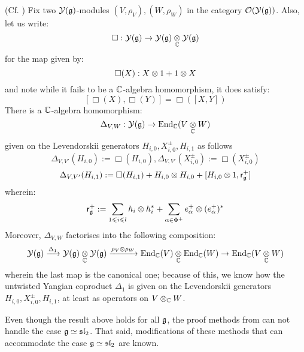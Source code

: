         \begin{proposition} \label{prop: yangian_hopf_structure_via_levendorskii_presentation}
            (Cf. \cite[Definition 4.6, Theorem 4.9, and Proposition 5.18]{guay_nakajima_wendlandt_affine_yangian_coproduct}) Fix two $\mathcal{Y}(\mathfrak{g})$-modules $(V, \rho_V), (W, \rho_W)$ in the category $\mathcal{O}(\mathcal{Y}(\mathfrak{g}))$. Also, let us write:
                $$\Box: \calY(\g) \to \calY(\g) \tensor_{\bbC} \calY(\g)$$
            for the map given by:
                $$\Box(X): X \tensor 1 + 1 \tensor X$$
            and note while it fails to be a $\mathbb{C}$-algebra homomorphism, it does satisfy:
                $$[ \Box(X), \Box(Y) ] = \Box( [X, Y] )$$
            There is a $\mathbb{C}$-algebra homomorphism:
                $$\Delta_{V, W}: \calY(\g) \to \End_{\bbC}(V \tensor_{\bbC} W)$$
            given on the Levendorskii generators $H_{i, 0}, X_{i, 0}^{\pm}, H_{i, 1}$ as follows
                $$\Delta_{V, V'}(H_{i, 0}) := \Box(H_{i, 0}), \Delta_{V, V'}(X_{i, 0}^{\pm}) := \Box(X_{i, 0}^{\pm})$$
                $$\Delta_{V, V'}(H_{i, 1}) := \Box(H_{i, 1}) + H_{i, 0} \tensor H_{i, 0} + [H_{i, 0} \tensor 1, \sfr_{\g}^+]$$
            wherein:
                $$\sfr_{\g}^+ := \sum_{1 \leq i \leq l} h_i \tensor h_i^* + \sum_{\alpha \in \Phi^+} e_{\alpha}^+ \tensor ( e_{\alpha}^+ )^*$$
            Moreover, $\Delta_{V, W}$ factorises into the following composition:
                $$\calY(\g) \xrightarrow[]{\Delta_1} \calY(\g) \tensor_{\bbC} \calY(\g) \xrightarrow[]{\rho_V \tensor \rho_W} \End_{\bbC}(V) \tensor_{\bbC} \End_{\bbC}(W) \to \End_{\bbC}(V \tensor_{\bbC} W)$$
            wherein the last map is the canonical one; because of this, we know how the untwisted Yangian coproduct $\Delta_1$ is given on the Levendorskii generators $H_{i, 0}, X_{i, 0}^{\pm}, H_{i, 1}$, at least as operators on $V \tensor_{\bbC} W$. 
        \end{proposition}
        \begin{remark}
            Even though the result above holds for all $\mathfrak{g}$, the proof methods from \cite[Theorem 4.9]{guay_nakajima_wendlandt_affine_yangian_coproduct} can not handle the case $\mathfrak{g} \simeq \mathfrak{sl}_2$. That said, modifications of these methods that can accommodate the case $\mathfrak{g} \simeq \mathfrak{sl}_2$ are known. 
        \end{remark}


